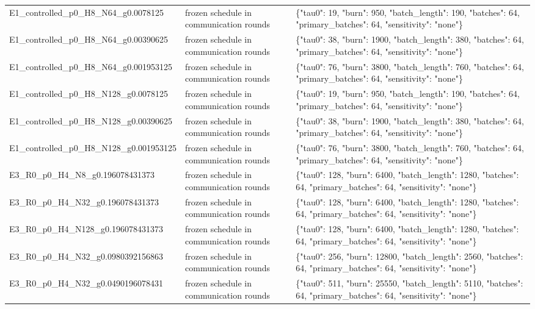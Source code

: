\begin{tabular}{lll}
E1\_controlled\_p0\_H8\_N64\_g0.0078125 & frozen schedule in communication rounds & \{"tau0": 19, "burn": 950, "batch\_length": 190, "batches": 64, "primary\_batches": 64, "sensitivity": "none"\} \\
E1\_controlled\_p0\_H8\_N64\_g0.00390625 & frozen schedule in communication rounds & \{"tau0": 38, "burn": 1900, "batch\_length": 380, "batches": 64, "primary\_batches": 64, "sensitivity": "none"\} \\
E1\_controlled\_p0\_H8\_N64\_g0.001953125 & frozen schedule in communication rounds & \{"tau0": 76, "burn": 3800, "batch\_length": 760, "batches": 64, "primary\_batches": 64, "sensitivity": "none"\} \\
E1\_controlled\_p0\_H8\_N128\_g0.0078125 & frozen schedule in communication rounds & \{"tau0": 19, "burn": 950, "batch\_length": 190, "batches": 64, "primary\_batches": 64, "sensitivity": "none"\} \\
E1\_controlled\_p0\_H8\_N128\_g0.00390625 & frozen schedule in communication rounds & \{"tau0": 38, "burn": 1900, "batch\_length": 380, "batches": 64, "primary\_batches": 64, "sensitivity": "none"\} \\
E1\_controlled\_p0\_H8\_N128\_g0.001953125 & frozen schedule in communication rounds & \{"tau0": 76, "burn": 3800, "batch\_length": 760, "batches": 64, "primary\_batches": 64, "sensitivity": "none"\} \\
E3\_R0\_p0\_H4\_N8\_g0.196078431373 & frozen schedule in communication rounds & \{"tau0": 128, "burn": 6400, "batch\_length": 1280, "batches": 64, "primary\_batches": 64, "sensitivity": "none"\} \\
E3\_R0\_p0\_H4\_N32\_g0.196078431373 & frozen schedule in communication rounds & \{"tau0": 128, "burn": 6400, "batch\_length": 1280, "batches": 64, "primary\_batches": 64, "sensitivity": "none"\} \\
E3\_R0\_p0\_H4\_N128\_g0.196078431373 & frozen schedule in communication rounds & \{"tau0": 128, "burn": 6400, "batch\_length": 1280, "batches": 64, "primary\_batches": 64, "sensitivity": "none"\} \\
E3\_R0\_p0\_H4\_N32\_g0.0980392156863 & frozen schedule in communication rounds & \{"tau0": 256, "burn": 12800, "batch\_length": 2560, "batches": 64, "primary\_batches": 64, "sensitivity": "none"\} \\
E3\_R0\_p0\_H4\_N32\_g0.0490196078431 & frozen schedule in communication rounds & \{"tau0": 511, "burn": 25550, "batch\_length": 5110, "batches": 64, "primary\_batches": 64, "sensitivity": "none"\} \\

\end{tabular}
